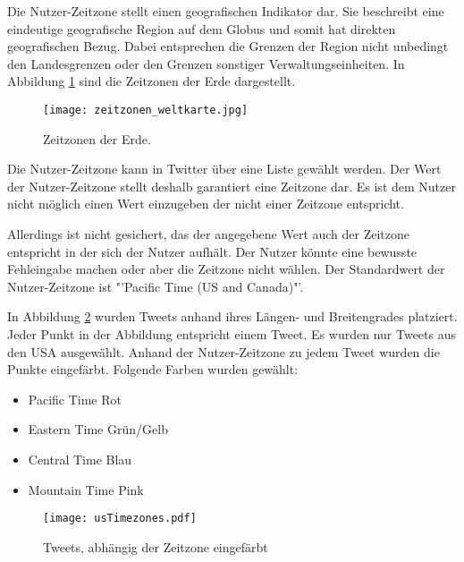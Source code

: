 				Die Nutzer-Zeitzone stellt einen geografischen Indikator dar.
				Sie beschreibt eine eindeutige geografische Region auf dem Globus und somit hat direkten geografischen Bezug.
				Dabei entsprechen die Grenzen der Region nicht unbedingt den Landesgrenzen oder den Grenzen sonstiger Verwaltungseinheiten. 
				In Abbildung \ref{img:timezones} sind die Zeitzonen der Erde dargestellt.

				\begin{figure}[h!]
					\begin{center}
						\texttt{[image: zeitzonen\_weltkarte.jpg]}
						\caption{Zeitzonen der Erde.}
						\label{img:timezones}
					\end{center}
				\end{figure}	

				Die Nutzer-Zeitzone kann in Twitter über eine Liste gewählt werden.
				Der Wert der Nutzer-Zeitzone stellt deshalb garantiert eine Zeitzone dar.
				Es ist dem Nutzer nicht möglich einen Wert einzugeben der nicht einer Zeitzone entspricht.

				Allerdings ist nicht gesichert, das der angegebene Wert auch der Zeitzone entspricht in der sich der Nutzer aufhält.
				Der Nutzer könnte eine bewusste Fehleingabe machen oder aber die Zeitzone nicht wählen.
				Der Standardwert der Nutzer-Zeitzone ist "'Pacific Time (US and Canada)"'.

				In Abbildung \ref{img:usTimezones} wurden Tweets anhand ihres Längen- und Breitengrades platziert.
				Jeder Punkt in der Abbildung entspricht einem Tweet.
				Es wurden nur Tweets aus den USA ausgewählt.
				Anhand der Nutzer-Zeitzone zu jedem Tweet wurden die Punkte eingefärbt.
				Folgende Farben wurden gewählt:

				\begin{itemize}
				 	\item Pacific Time Rot
				 	\item Eastern Time	Grün/Gelb
				 	\item Central Time Blau
				 	\item Mountain Time Pink 
				 \end{itemize} 

				 \begin{figure}[h!]
					\begin{center}
						\texttt{[image: usTimezones.pdf]}
						\caption{Tweets, abhängig der Zeitzone eingefärbt}
						\label{img:usTimezones}
					\end{center}
				\end{figure}	

